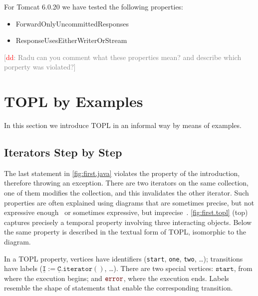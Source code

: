 \documentclass{sigplanconf}[10pt] %
\newcommand{\noterg}[2]{\textcolor{gray}{[\textcolor{red}{#1}: #2]}}
\newcommand{\dd}[1]{\noterg{dd}{#1}}
\newcommand{\dinocomment}[1]{\dd{#1}}
\newcommand{\error}{\ensuremath{\textcolor{darkred}{\mathtt{error}}}\xspace}
\newcommand{\pattern}[1]{\ensuremath{\mathtt{\underline{#1}}}}
\newcommand{\start}{\ensuremath{\mathtt{start}}\xspace}
\begin{document}
For Tomcat  6.0.20  we have tested the following properties:
\begin{itemize}
\item ForwardOnlyUncommittedResponses
\item ResponseUsesEitherWriterOrStream
\end{itemize}
\dinocomment{Radu can you comment what these properties mean? and describe which porperty was violated?}

\section{TOPL by Examples} \label{sec:examples} %

In this section we introduce TOPL in an informal way by means of examples.

\subsection{Iterators Step by Step} \label{sec:examples.steps} %

The last statement in \autoref{fig:first.java} violates the property of the introduction, therefore throwing an exception.
There are two iterators on the same collection, one of them modifies the collection, and this invalidates the other iterator.
Such properties are often explained using diagrams that are sometimes precise, but not expressive enough~\cite{dblp:journals/scp/FieldGRY05,dblp:conf/issta/FinkYDRG06} or sometimes expressive, but imprecise~\cite{dblp:conf/oopsla/bierhoffa07,dblp:conf/oopsla/naeeml08,dblp:conf/sigsoft/boddenlh08,dblp:conf/ecoop/bierhoffba09}.
\autoref{fig:first.topl} (top)  captures precisely a temporal property involving three interacting objects.
Below the same property is described in the textual form of TOPL, isomorphic to the diagram.

In a TOPL property, vertices have identifiers (\texttt{start}, \texttt{one}, \texttt{two}, \dots);
transitions have labels ($\pattern I:=\pattern C.\mathtt{iterator}()$, \dots).
There are two special vertices: \start, from where the execution begins; and \error, where the execution ends.
Labels resemble the shape of statements that enable the corresponding transition.
\end{document}
